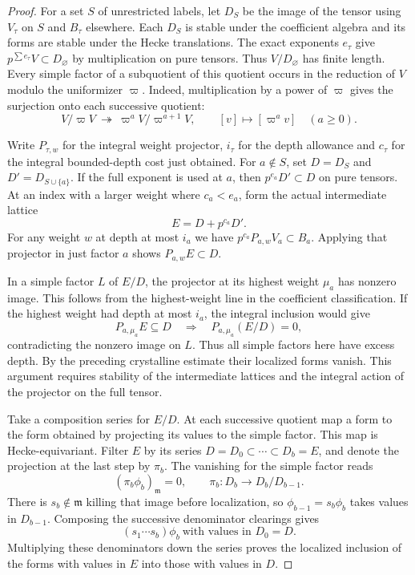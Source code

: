 \begin{proof}
For a set \(S\) of
unrestricted labels, let \(D_S\) be the image of the tensor
using \(V_\tau\) on \(S\) and \(B_\tau\) elsewhere. Each
\(D_S\) is stable under the coefficient algebra and its forms
are stable under the Hecke translations. The exact exponents
\(e_\tau\) give \(p^{\sum e_\tau}V\subset D_\varnothing\)
by multiplication on pure tensors. Thus \(V/D_\varnothing\)
has finite length. Every simple factor of a subquotient of
this quotient occurs in the reduction of \(V\) modulo the
uniformizer \(\varpi\). Indeed, multiplication by a power of \(\varpi\) gives the surjection onto each successive quotient:
\[
 V/\varpi V\ \twoheadrightarrow\ \varpi^a V/\varpi^{a+1}V,\qquad [v]\longmapsto[\varpi^a v]\quad(a\ge0).
\]

Write \(P_{\tau,w}\) for the integral weight projector,
\(i_\tau\) for the depth allowance and \(c_\tau\) for the
integral bounded-depth cost just obtained. For
\(a\notin S\), set \(D=D_S\) and \(D'=D_{S\cup\{a\}}\).
If the full exponent is used at \(a\), then
\(p^{e_a}D'\subset D\) on pure tensors. At an index with a larger weight
where \(c_a<e_a\), form the actual intermediate lattice
\[
                          E=D+p^{c_a}D'.
\]
For any weight \(w\) at depth at most \(i_a\) we have
\(p^{c_a}P_{a,w}V_a\subset B_a\). Applying that projector
in just factor \(a\) shows \(P_{a,w} E\subset D\).

In a simple factor \(L\) of \(E/D\), the projector at its
highest weight \(\mu_a\) has nonzero image. This follows
from the highest-weight line in the coefficient classification.
If the highest weight had depth at most \(i_a\), the integral inclusion would give
\[
 P_{a,\mu_a}E\subseteq D\quad\Longrightarrow\quad P_{a,\mu_a}(E/D)=0,
\]
contradicting the nonzero image on \(L\). Thus all simple factors here have
excess depth. By the preceding crystalline estimate their
localized forms vanish. This argument requires stability of
the intermediate lattices and the integral action of the
projector on the full tensor.

Take a composition series for \(E/D\). At each successive
quotient map a form to the form obtained by projecting its
values to the simple factor. This map is Hecke-equivariant.
Filter \(E\) by its series \(D=D_0\subset\cdots\subset D_b=E\), and denote the projection at the last step by \(\pi_b\). The vanishing for the simple factor reads
\[
 (\pi_b\phi_b)_{\mathfrak m}=0,\qquad \pi_b:D_b\to D_b/D_{b-1}.
\]
There is \(s_b\notin\mathfrak m\) killing that image before
localization, so \(\phi_{b-1}=s_b\phi_b\) takes values in
\(D_{b-1}\). Composing the successive denominator clearings gives
\[
 (s_1\cdots s_b)\phi_b\ \text{with values in }D_0=D .
\]
Multiplying these denominators down the series proves the
localized inclusion of the forms with values in \(E\) into
those with values in \(D\).


\end{proof}
